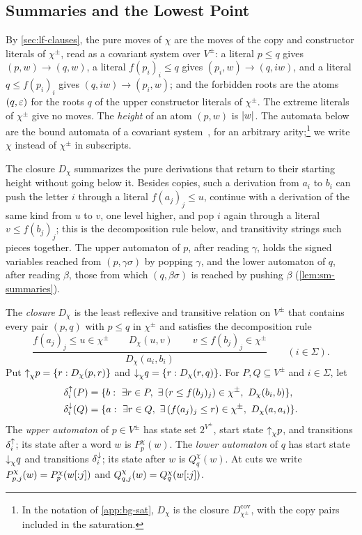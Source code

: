 \subsection{Summaries and the Lowest Point}\label{sec:sm-lowest}

By \cref{sec:lf-clauses}, the pure moves of $\chi$ are the moves of the copy
and constructor literals of $\chi^\pm$, read as a covariant system over
$V^\pm$: a literal $p\le q$ gives $(p,w)\to(q,w)$, a literal $f(p_i)_i\le q$
gives $(p_i,w)\to(q,iw)$, and a literal $q\le f(p_i)_i$ gives
$(q,iw)\to(p_i,w)$; and the forbidden roots are the atoms $(q,\varepsilon)$ for the
roots $q$ of the upper constructor literals of $\chi^\pm$. The extreme
literals of $\chi^\pm$ give no moves. The \emph{height} of an atom $(p,w)$ is
$\lvert w\rvert$. The automata below are the bound automata
of a covariant system~\citep{Zhao26}, for an arbitrary
arity;\footnote{In the notation of \cref{app:bg-sat}, $D_\chi$ is the closure
$D^{\mathrm{cov}}_{\chi^\pm}$, with the copy pairs included in the
saturation.} we write $\chi$ instead of $\chi^\pm$ in subscripts.

The closure $D_\chi$ summarizes the pure derivations that return to their
starting height without going below it. Besides copies, such a derivation from
$a_i$ to $b_i$ can push the letter $i$ through a literal $f(a_j)_j\le u$,
continue with a derivation of the same kind from $u$ to $v$, one level higher,
and pop $i$ again through a literal $v\le f(b_j)_j$; this is the decomposition
rule below, and transitivity strings such pieces together. The upper automaton of $p$, after reading $\gamma$, holds the signed
variables reached from $(p,\gamma\sigma)$ by popping $\gamma$, and the lower
automaton of $q$, after reading $\beta$, those from which $(q,\beta\sigma)$ is
reached by pushing $\beta$ (\cref{lem:sm-summaries}).

\begin{definition}\label{def:sm-automata}
The \emph{closure} $D_\chi$ is the least reflexive and transitive relation on
$V^\pm$ that contains every pair $(p,q)$ with $p\le q$ in $\chi^\pm$ and
satisfies the decomposition rule
\[
 \frac{f(a_j)_j\le u\in\chi^\pm\qquad D_\chi(u,v)\qquad v\le f(b_j)_j\in\chi^\pm}
      {D_\chi(a_i,b_i)}\qquad(i\in\Sigma).
\]
Put $\mathord{\uparrow}_{\chi} p=\{r:D_\chi(p,r)\}$ and $\mathord{\downarrow}_{\chi} q=\{r:D_\chi(r,q)\}$. For
$P,Q\subseteq V^\pm$ and $i\in\Sigma$, let
\[
\begin{aligned}
 \delta^{\uparrow}_{i}(P)&=\{b:\ \exists r\in P,\ \exists\,(r\le f(b_j)_j)\in\chi^\pm,\
  D_\chi(b_i,b)\},\\
 \delta^{\downarrow}_{i}(Q)&=\{a:\ \exists r\in Q,\ \exists\,(f(a_j)_j\le r)\in\chi^\pm,\
  D_\chi(a,a_i)\}.
\end{aligned}
\]
The \emph{upper automaton} of $p\in V^\pm$ has state set $2^{V^\pm}$, start
state $\mathord{\uparrow}_{\chi} p$, and transitions $\delta^{\uparrow}_{i}$; its state after a word $w$ is
$P^\chi_p(w)$. The \emph{lower automaton} of $q$ has start state $\mathord{\downarrow}_{\chi}
q$ and transitions $\delta^{\downarrow}_{i}$; its state after $w$ is $Q^\chi_q(w)$. At cuts we
write $P^\chi_{p,j}(w)=P^\chi_p(w[{:}j])$ and $Q^\chi_{q,j}(w)=Q^\chi_q(w[{:}j])$.
\end{definition}

